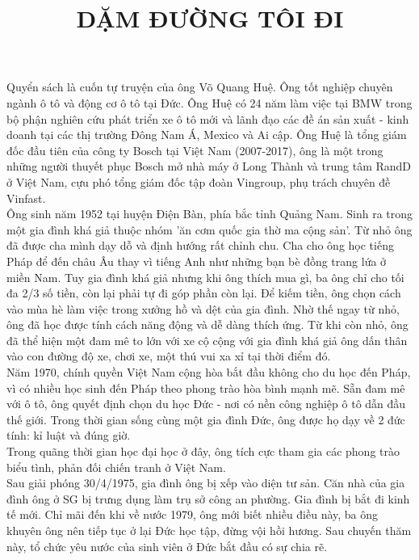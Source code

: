 \documentclass{article}
\title{DẶM ĐƯỜNG TÔI ĐI}
\newcommand\tab[1][1cm]{\hspace*{#1}}
\begin{document}
\maketitle

\tab Quyển sách là cuốn tự truyện của ông Võ Quang Huệ. Ông tốt nghiệp chuyên ngành ô tô và động cơ ô tô tại Đức.
Ông Huệ có 24 năm làm việc tại BMW trong bộ phận nghiên cứu phát triển xe ô tô mới và lãnh đạo các đề án
sản xuất - kinh doanh tại các thị trường Đông Nam Á, Mexico và Ai cập. Ông Huệ là tổng giám đốc đầu tiên của công 
ty Bosch tại Việt Nam (2007-2017), ông là một trong những người thuyết phục Bosch mở nhà máy ở Long Thành và trung tâm
RandD ở Việt Nam, cựu phó tổng giám đốc tập đoàn Vingroup, phụ trách chuyên đề Vinfast.\\

\tab Ông sinh năm 1952 tại huyện Điện Bàn, phía bắc tỉnh Quảng Nam. Sinh ra trong một gia đình khá giả thuộc nhóm 
'ăn cơm quốc gia thờ ma cộng sản'. Từ nhỏ ông đã được cha mình dạy dỗ và định hướng rất chỉnh chu. Cha cho ông học 
tiếng Pháp để đến châu Âu thay vì tiếng Anh như những bạn bè đồng trang lứa ở miền Nam. Tuy gia đình khá giả nhưng 
khi ông thích mua gì, ba ông chỉ cho tối đa 2/3 số tiền, còn lại phải tự đi góp phần còn lại. Để kiếm tiền, 
ông chọn cách vào mùa hè làm việc trong xưởng hồ và dệt của gia đình. Nhờ thế ngay từ nhỏ, ông đã học được tính cách 
năng động và dễ dàng thích ứng. Từ khi còn nhỏ, ông đã thể hiện một đam mê to lớn với xe cộ cộng với gia đình khá giả
ông dấn thân vào con đường độ xe, chơi xe, một thú vui xa xỉ tại thời điểm đó. \\
\tab Năm 1970, chính quyền Việt Nam cộng hòa bắt đầu không cho du học đến Pháp, vì có nhiều học sinh đến Pháp theo 
phong trào hòa bình mạnh mẽ. Sẵn đam mê với ô tô, ông quyết định chọn du học Đức - nơi có nền công nghiệp ô tô dẫn 
đầu thế giới. Trong thời gian sống cùng một gia đình Đức, ông được họ dạy về 2 đức tính: kỉ luật và đúng giờ.\\
\tab Trong quãng thời gian học đại học ở đây, ông tích cực tham gia các phong trào biểu tình, phản đối chiến tranh ở 
Việt Nam.\\
\tab Sau giải phóng 30/4/1975, gia đình ông bị xếp vào diện tư sản. Căn nhà của gia đình ông ở SG bị trưng dụng làm 
trụ sở công an phường. Gia đình bị bắt đi kinh tế mới. Chỉ mãi đến khi về nước 1979, ông mới biết nhiều điều này, ba
ông khuyên ông nên tiếp tục ở lại Đức học tập, đừng vội hồi hương. Sau chuyến thăm này, tổ chức yêu nước của sinh viên
ở Đức bắt đầu có sự chia rẽ.\\
\end{document}
